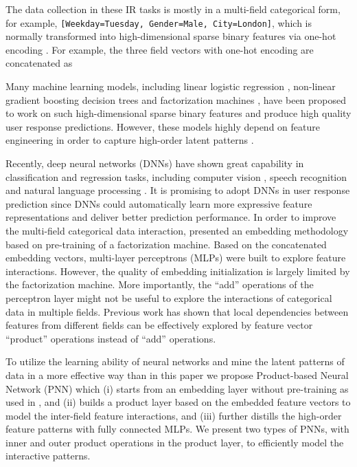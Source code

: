 \documentclass[conference]{IEEEtran}
\begin{document}
The data collection in these IR tasks is mostly in a multi-field categorical form, for example, \texttt{[Weekday=Tuesday, Gender=Male, City=London]}, which is normally transformed into high-dimensional sparse binary features via one-hot encoding \cite{he2014practical}.
For example, the three field vectors with one-hot encoding are concatenated as

Many machine learning models, including linear logistic regression \cite{lee2012estimating}, non-linear gradient boosting decision trees \cite{he2014practical} and factorization machines \cite{ta2015factorization}, have been proposed to work on such high-dimensional sparse binary features and produce high quality user response predictions.
However, these models highly depend on feature engineering in order to capture high-order latent patterns \cite{cui2011bid}.


Recently, deep neural networks (DNNs) \cite{lecun2015deep} have shown great capability in classification and regression tasks, including computer vision \cite{krizhevsky2012imagenet}, speech recognition \cite{graves2013speech} and natural language processing \cite{mikolov2013distributed}. It is promising to adopt DNNs in user response prediction since DNNs could automatically learn more expressive feature representations and deliver better prediction performance.
In order to improve the multi-field categorical data interaction, \cite{zhang2016deep} presented an embedding methodology based on pre-training of a factorization machine. Based on the concatenated embedding vectors, multi-layer perceptrons (MLPs) were built to explore feature interactions. However, the quality of embedding initialization is largely limited by the factorization machine.
More importantly, the ``add'' operations of the perceptron layer might not be useful to explore the interactions of categorical data in multiple fields. Previous work \cite{menon2011response,ta2015factorization} has shown that local dependencies between features from different fields can be effectively explored by feature vector ``product'' operations instead of ``add'' operations.






To utilize the learning ability of neural networks and mine the latent patterns of data in a more effective way than  in this paper we propose Product-based Neural Network (PNN) which (i) starts from an embedding layer without pre-training as used in \cite{zhang2016deep}, and (ii) builds a product layer based on the embedded feature vectors to model the inter-field feature interactions, and (iii) further distills the high-order feature patterns with fully connected MLPs.
We present two types of PNNs, with inner and outer product operations in the product layer, to efficiently model the interactive patterns.
\end{document}
